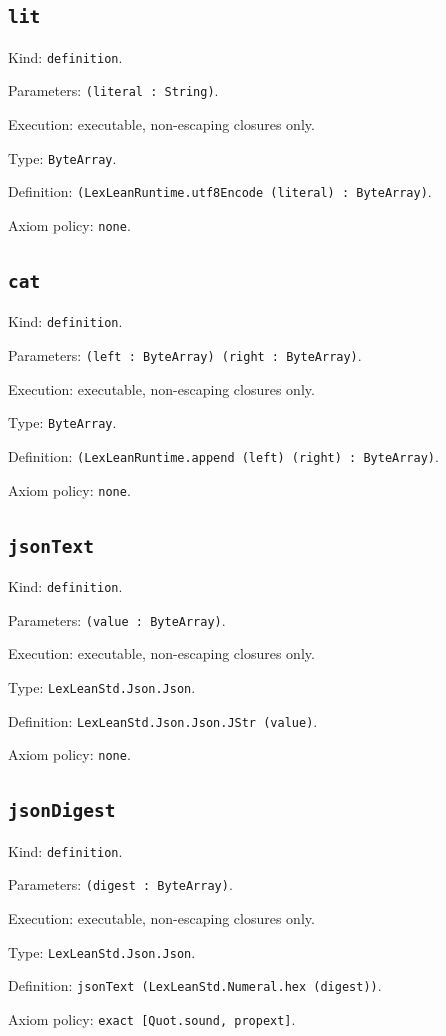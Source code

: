 \documentclass[11pt]{article}
\begin{document}
\subsection*{\texttt{lit}}
\noindent Kind: \texttt{definition}.\par
\noindent Parameters: \texttt{(literal : String)}.\par
\noindent Execution: executable, non-escaping closures only.\par
\noindent Type: \texttt{ByteArray}.\par
\noindent Definition: \texttt{(LexLeanRuntime.utf8Encode (literal) : ByteArray)}.\par
\noindent Axiom policy: \texttt{none}.\par
\subsection*{\texttt{cat}}
\noindent Kind: \texttt{definition}.\par
\noindent Parameters: \texttt{(left : ByteArray) (right : ByteArray)}.\par
\noindent Execution: executable, non-escaping closures only.\par
\noindent Type: \texttt{ByteArray}.\par
\noindent Definition: \texttt{(LexLeanRuntime.append (left) (right) : ByteArray)}.\par
\noindent Axiom policy: \texttt{none}.\par
\subsection*{\texttt{jsonText}}
\noindent Kind: \texttt{definition}.\par
\noindent Parameters: \texttt{(value : ByteArray)}.\par
\noindent Execution: executable, non-escaping closures only.\par
\noindent Type: \texttt{LexLeanStd.Json.Json}.\par
\noindent Definition: \texttt{LexLeanStd.Json.Json.JStr (value)}.\par
\noindent Axiom policy: \texttt{none}.\par
\subsection*{\texttt{jsonDigest}}
\noindent Kind: \texttt{definition}.\par
\noindent Parameters: \texttt{(digest : ByteArray)}.\par
\noindent Execution: executable, non-escaping closures only.\par
\noindent Type: \texttt{LexLeanStd.Json.Json}.\par
\noindent Definition: \texttt{jsonText (LexLeanStd.Numeral.hex (digest))}.\par
\noindent Axiom policy: \texttt{exact [Quot.sound, propext]}.\par
\end{document}
